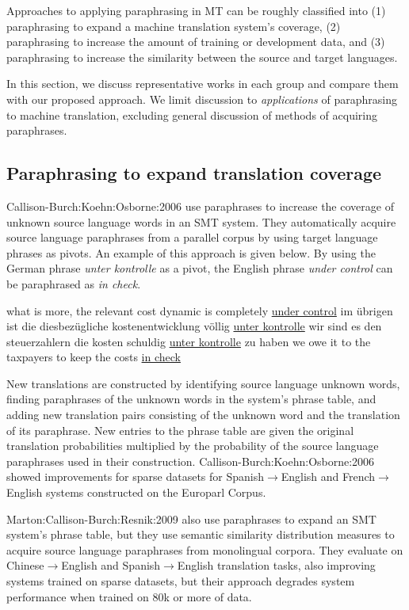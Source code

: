\documentclass[english]{jnlp_1.4}
\newcommand{\citet}{}
\begin{document}
Approaches to applying paraphrasing in MT can be roughly classified
into (1) paraphrasing to expand a machine translation system's
coverage, (2) paraphrasing to increase the amount of training or
development data, and (3) paraphrasing to increase the similarity
between the source and target languages.

In this section, we discuss representative works in each group and
compare them with our proposed approach. We limit discussion to {\it
applications} of paraphrasing to machine translation, excluding
general discussion of methods of acquiring paraphrases.


\subsection{Paraphrasing to expand translation coverage}

\citet{Callison-Burch:Koehn:Osborne:2006} use paraphrases to increase
the coverage of unknown source language words in an SMT system. They
automatically acquire source language paraphrases from a parallel
corpus by using target language phrases as pivots. An example of this
approach is given below. By using the German phrase \textit{unter
kontrolle} as a pivot, the English phrase \textit{under control} can
be paraphrased as \textit{in check}.

\begin{exe}
  \ex what is more, the relevant cost dynamic is completely \ul{under control}
  \trans im \"ubrigen ist die diesbez\"ugliche kostenentwicklung v\"ollig
  \ul{unter kontrolle}
\ex wir sind es den steuerzahlern die kosten schuldig  \ul{unter kontrolle}
zu haben
\trans we owe it to the taxpayers to keep the costs \ul{in check}
\end{exe}

New translations are constructed by identifying source language
unknown words, finding paraphrases of the unknown words in the
system's phrase table, and adding new translation pairs consisting of
the unknown word and the translation of its paraphrase. New entries to
the phrase table are given the original translation probabilities
multiplied by the probability of the source language paraphrases used
in their construction. \citet{Callison-Burch:Koehn:Osborne:2006}
showed improvements for sparse datasets for
Spanish$\rightarrow$English and French$\rightarrow$English systems
constructed on the Europarl Corpus.

\citet{Marton:Callison-Burch:Resnik:2009} also use paraphrases to
expand an SMT system's phrase table, but they use semantic similarity
distribution measures to acquire source language paraphrases from
monolingual corpora. They evaluate on Chinese$\rightarrow$English and
Spanish$\rightarrow$English translation tasks, also improving systems
trained on sparse datasets, but their approach degrades system
performance when trained on 80k or more of data.
\end{document}

